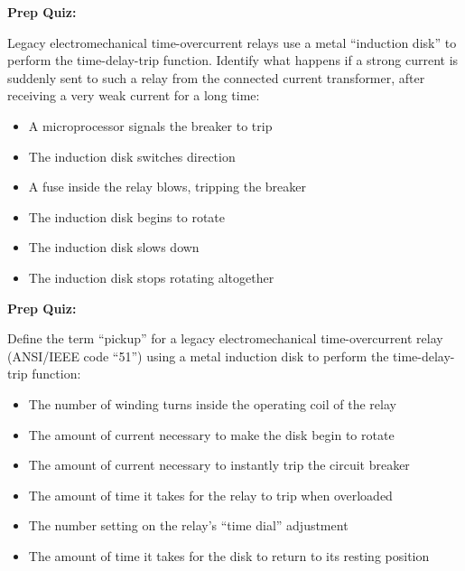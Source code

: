 \vfil \eject

\noindent
{\bf Prep Quiz:}

Legacy electromechanical time-overcurrent relays use a metal ``induction disk'' to perform the time-delay-trip function.  Identify what happens if a strong current is suddenly sent to such a relay from the connected current transformer, after receiving a very weak current for a long time:

\begin{itemize}
\item{} A microprocessor signals the breaker to trip
\vskip 5pt 
\item{} The induction disk switches direction
\vskip 5pt 
\item{} A fuse inside the relay blows, tripping the breaker
\vskip 5pt 
\item{} The induction disk begins to rotate
\vskip 5pt 
\item{} The induction disk slows down
\vskip 5pt 
\item{} The induction disk stops rotating altogether
\end{itemize}










\vfil \eject

\noindent
{\bf Prep Quiz:}

Define the term ``pickup'' for a legacy electromechanical time-overcurrent relay (ANSI/IEEE code ``51'') using a metal induction disk to perform the time-delay-trip function:

\begin{itemize}
\item{} The number of winding turns inside the operating coil of the relay
\vskip 5pt 
\item{} The amount of current necessary to make the disk begin to rotate
\vskip 5pt 
\item{} The amount of current necessary to instantly trip the circuit breaker
\vskip 5pt 
\item{} The amount of time it takes for the relay to trip when overloaded
\vskip 5pt 
\item{} The number setting on the relay's ``time dial'' adjustment
\vskip 5pt 
\item{} The amount of time it takes for the disk to return to its resting position
\end{itemize}




